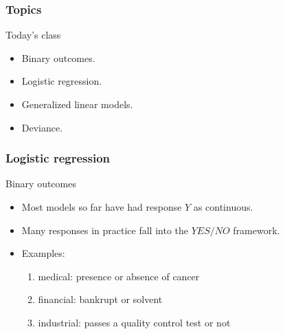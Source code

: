 \documentclass[handout]{beamer}
\begin{document}
   \begin{frame} \frametitle{Topics}

   \begin{block}
   {Today's class}
     \begin{itemize}


     \item Binary outcomes.

     \item Logistic regression.

     \item Generalized linear models.

     \item Deviance.

   \end{itemize}

   \end{block}
   \end{frame}


   \begin{frame} \frametitle{Logistic regression}

   \begin{block}
       {Binary outcomes}
       \begin{itemize}
       \item Most models so far have had response $Y$ as continuous.

       \item Many responses in practice fall into the $YES/NO$ framework.

       \item Examples:
         \begin{enumerate}
         \item medical: presence or absence of cancer

         \item financial: bankrupt or solvent

         \item industrial: passes a quality control test or not
         \end{enumerate}
       \end{itemize}
   \end{block}
   \end{frame}

\end{document}
